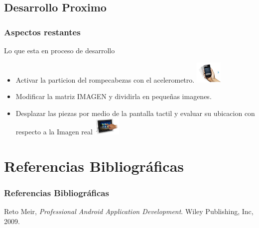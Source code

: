 \documentclass[serif,11pt]{beamer}
\begin{document}
	\subsection{Desarrollo Proximo}
		\begin{frame}
			\frametitle{Aspectos restantes}

			\begin{block}{Lo que esta en proceso de desarrollo}
										
						\begin{itemize}
							 \pause
							\item Activar la particion del rompecabezas con el acelerometro.
							\includegraphics[width=0.1\textwidth]{shake} 
							\bigskip
							\pause
							\item Modificar la matriz IMAGEN y dividirla en pequeñas imagenes.

							\bigskip
							\pause
							\item Desplazar las piezas por medio de la pantalla tactil y evaluar su ubicacion con respecto a la Imagen real
							\includegraphics[width=0.1\textwidth]{touch} 
							\bigskip
							
						\end{itemize}
			\end{block}
					
		\end{frame}

	\section{Referencias Bibliogr\'aficas} 

		\begin{frame}\frametitle<presentation>{Referencias Bibliogr\'aficas}


			\begin{thebibliography}{10}

				\bibitem{lamport94}
					  Reto Meir, 
   					\emph{Professional Android Application Development}.
 					 Wiley Publishing, Inc,
  					  2009.

			\end{thebibliography}
		\end{frame}
\end{document}

